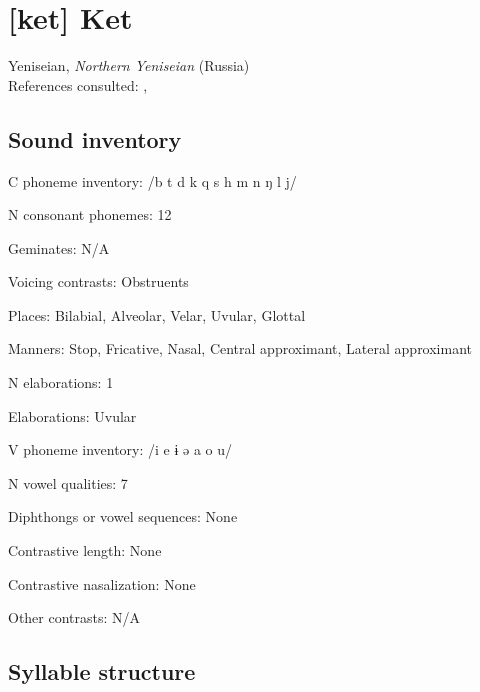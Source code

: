 {\section*{[ket] Ket}  %
Yeniseian, \textit{Northern Yeniseian} (Russia)\medskip\\
References consulted: \citet{Georg2007}, \citet{Vajda2000}

\subsection*{Sound inventory}
\begin{appendixdesc}

\item[C phoneme inventory:] /b t d k q s h m n ŋ l j/

\item[N consonant phonemes:] 12

\item[Geminates:] N/A

\item[Voicing contrasts:] Obstruents

\item[Places:] Bilabial, Alveolar, Velar, Uvular, Glottal

\item[Manners:] Stop, Fricative, Nasal, Central approximant, Lateral approximant

\item[N elaborations:] 1

\item[Elaborations:] Uvular

\item[V phoneme inventory:] /i e ɨ ə a o u/

\item[N vowel qualities:] 7

\item[Diphthongs or vowel sequences:] None

\item[Contrastive length:] None

\item[Contrastive nasalization:] None

\item[Other contrasts:] N/A
\end{appendixdesc}
\subsection*{Syllable structure}
\begin{appendixdesc}


\end{appendixdesc}}
